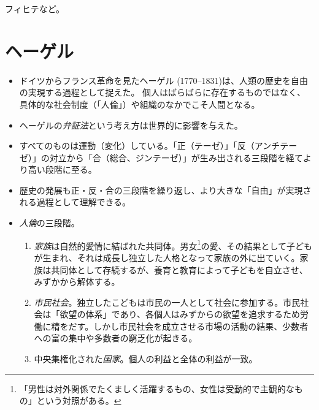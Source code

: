 \documentclass[uplatex,dvipdfmx]{jsarticle} \usepackage{mystyle}%
\begin{document}
フィヒテなど。





\section{ヘーゲル}

\begin{itemize}

\item ドイツからフランス革命を見たヘーゲル (1770--1831)は、人類の歴史を自由の実現する過程として捉えた。
個人はばらばらに存在するものではなく、具体的な社会制度（「人倫」）や組織のなかでこそ人間となる。

\item ヘーゲルの\emph{弁証法}という考え方は世界的に影響を与えた。
\item すべてのものは運動（変化）している。「正（テーゼ）」「反（アンチテーゼ）」の対立から「合（総合、ジンテーゼ）」が生み出される三段階を経てより高い段階に至る。

\item 歴史の発展も正・反・合の三段階を繰り返し、より大きな「自由」が実現される過程として理解できる。

\item \emph{人倫}の三段階。
  \begin{enumerate}
  \item \emph{家族}は自然的愛情に結ばれた共同体。男女\footnote{「男性は対外関係でたくましく活躍するもの、女性は受動的で主観的なもの」という対照がある。}の愛、その結果として子どもが生まれ、それは成長し独立した人格となって家族の外に出ていく。家族は共同体として存続するが、養育と教育によって子どもを自立させ、みずかから解体する。

\item \emph{市民社会}。独立したこどもは市民の一人として社会に参加する。市民社会は「欲望の体系」であり、各個人はみずからの欲望を追求するため労働に精をだす。しかし市民社会を成立させる市場の活動の結果、少数者への富の集中や多数者の窮乏化が起きる。

\item 中央集権化された\emph{国家}。個人の利益と全体の利益が一致。

  \end{enumerate}





\end{itemize}
\end{document}
